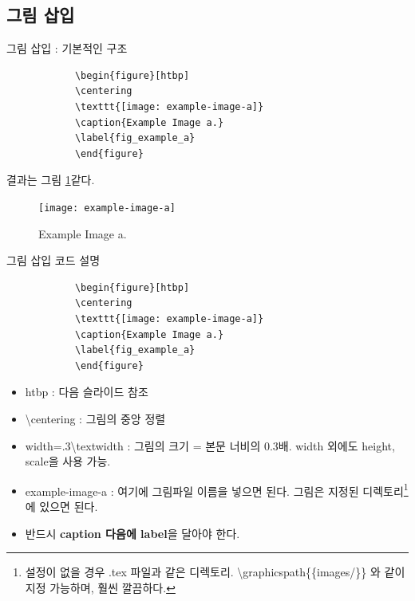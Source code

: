 \documentclass[12pt]{beamer}
\begin{document}
\subsection{그림 삽입}
\begin{frame}[fragile]{그림 삽입 : 기본적인 구조}
	\begin{center}
		\begin{scriptsize}
			\begin{verbatim}
			\begin{figure}[htbp]
			\centering
			\texttt{[image: example-image-a]}
			\caption{Example Image a.}
			\label{fig_example_a}
			\end{figure}
			\end{verbatim}
		\end{scriptsize}
	\end{center}
	결과는 그림 \ref{fig_example_a}\와 같다.
	
	\begin{figure}[htbp]
		\centering
		\texttt{[image: example-image-a]}
		\caption{Example Image a.}
		\label{fig_example_a}
	\end{figure}
\end{frame}
\begin{frame}[fragile]{그림 삽입 코드 설명}
	\begin{center}
		\begin{scriptsize}
			\begin{verbatim}
			\begin{figure}[htbp]
			\centering
			\texttt{[image: example-image-a]}
			\caption{Example Image a.}
			\label{fig_example_a}
			\end{figure}
			\end{verbatim}
		\end{scriptsize}
	\end{center}
	\begin{itemize}
		\item htbp : 다음 슬라이드 참조
		\item \textbackslash centering : 그림의 중앙 정렬
		\item width=.3\textbackslash textwidth : 그림의 크기 = 본문 너비의 0.3배. width 외에도 height, scale을 사용 가능.
		\item example-image-a : 여기에 그림파일 이름을 넣으면 된다. 그림은 지정된 디렉토리\footnote{설정이 없을 경우 .tex 파일과 같은 디렉토리. \textbackslash graphicspath\{\{images/\}\} 와 같이 지정 가능하며, 훨씬 깔끔하다.}에 있으면 된다.
		\item 반드시 \textbf{caption 다음에 label}을 달아야 한다.
	\end{itemize}
\end{frame}
\end{document}
